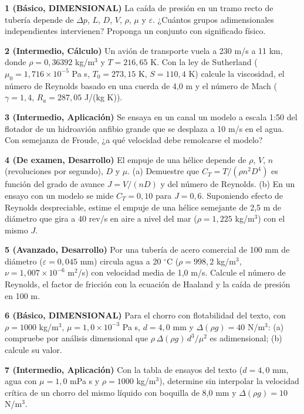 \documentclass[10pt,openany]{book}
\begin{document}
\begin{tcolorbox}[title={Ejercicios propuestos}, studiumworked, breakable]

\noindent\textbf{1 (Básico, DIMENSIONAL)}
La caída de presión en un tramo recto de tubería depende de \(\Delta p\), \(L\), \(D\), \(V\), \(\rho\), \(\mu\) y \(\varepsilon\). ¿Cuántos grupos adimensionales independientes intervienen? Proponga un conjunto con significado físico.

\noindent\textbf{2 (Intermedio, Cálculo)}
Un avión de transporte vuela a 230 m/s a 11 km, donde \(\rho = 0{,}36392\) kg/m\(^3\) y \(T = 216{,}65\) K. Con la ley de Sutherland (\(\mu_0 = 1{,}716\times 10^{-5}\) Pa s, \(T_0 = 273{,}15\) K, \(S = 110{,}4\) K) calcule la viscosidad, el número de Reynolds basado en una cuerda de 4,0 m y el número de Mach (\(\gamma = 1{,}4\), \(R_a = 287{,}05\) J/(kg K)).

\noindent\textbf{3 (Intermedio, Aplicación)}
Se ensaya en un canal un modelo a escala 1:50 del flotador de un hidroavión anfibio grande que se desplaza a 10 m/s en el agua. Con semejanza de Froude, ¿a qué velocidad debe remolcarse el modelo?

\noindent\textbf{4 (De examen, Desarrollo)}
El empuje de una hélice depende de \(\rho\), \(V\), \(n\) (revoluciones por segundo), \(D\) y \(\mu\). (a) Demuestre que \(C_T = T/(\rho n^{2}D^{4})\) es función del grado de avance \(J = V/(nD)\) y del número de Reynolds. (b) En un ensayo con un modelo se mide \(C_T = 0{,}10\) para \(J = 0{,}6\). Suponiendo efecto de Reynolds despreciable, estime el empuje de una hélice semejante de 2,5 m de diámetro que gira a 40 rev/s en aire a nivel del mar (\(\rho = 1{,}225\) kg/m\(^3\)) con el mismo \(J\).

\noindent\textbf{5 (Avanzado, Desarrollo)}
Por una tubería de acero comercial de 100 mm de diámetro (\(\varepsilon = 0{,}045\) mm) circula agua a 20 \(^\circ\)C (\(\rho = 998{,}2\) kg/m\(^3\), \(\nu = 1{,}007\times 10^{-6}\) m\(^2\)/s) con velocidad media de 1,0 m/s. Calcule el número de Reynolds, el factor de fricción con la ecuación de Haaland y la caída de presión en 100 m.

\noindent\textbf{6 (Básico, DIMENSIONAL)}
Para el chorro con flotabilidad del texto, con \(\rho = 1000\) kg/m\(^3\), \(\mu = 1{,}0\times 10^{-3}\) Pa s, \(d = 4{,}0\) mm y \(\Delta(\rho g) = 40\) N/m\(^3\): (a) compruebe por análisis dimensional que \(\rho\,\Delta(\rho g)\,d^{3}/\mu^{2}\) es adimensional; (b) calcule su valor.

\noindent\textbf{7 (Intermedio, Aplicación)}
Con la tabla de ensayos del texto (\(d = 4{,}0\) mm, agua con \(\mu = 1{,}0\) mPa s y \(\rho = 1000\) kg/m\(^3\)), determine sin interpolar la velocidad crítica de un chorro del mismo líquido con boquilla de 8,0 mm y \(\Delta(\rho g) = 10\) N/m\(^3\).


\end{tcolorbox}
\end{document}

